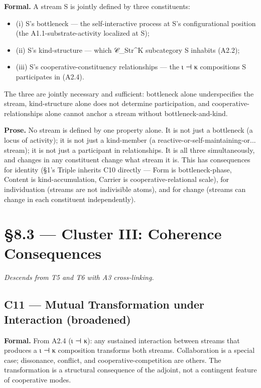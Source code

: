 \documentclass[11pt, openany]{book}
\newcommand{\sectionbreak}{\clearpage}
\begin{document}
\textbf{Formal.} A stream S is jointly defined by three constituents:

\begin{itemize}
\item (i) S's bottleneck --- the self-interactive process at S's configurational position (the A1.1-substrate-activity localized at S);
\item (ii) S's kind-structure --- which 𝒞\_\allowbreak{}Str\textasciicircum{}K subcategory S inhabits (A2.2);
\item (iii) S's cooperative-constituency relationships --- the ι ⊣ κ compositions S participates in (A2.4).
\end{itemize}

The three are jointly necessary and sufficient: bottleneck alone underspecifies the stream, kind-structure alone does not determine participation, and cooperative-relationships alone cannot anchor a stream without bottleneck-and-kind.

\textbf{Prose.} No stream is defined by one property alone. It is not just a bottleneck (a locus of activity); it is not just a kind-member (a reactive-or-self-maintaining-or... stream); it is not just a participant in relationships. It is all three simultaneously, and changes in any constituent change what stream it is. This has consequences for identity (§1's Triple inherits C10 directly --- Form is bottleneck-phase, Content is kind-accumulation, Carrier is cooperative-relational scale), for individuation (streams are not indivisible atoms), and for change (streams can change in each constituent independently).

\sectionbreak

\section{§8.3 --- Cluster III: Coherence Consequences}

\textit{Descends from T5 and T6 with A3 cross-linking.}

\subsection{C11 --- Mutual Transformation under Interaction (broadened)}

\textbf{Formal.} From A2.4 (ι ⊣ κ): any sustained interaction between streams that produces a ι ⊣ κ composition transforms both streams. Collaboration is a special case; dissonance, conflict, and cooperative-competition are others. The transformation is a structural consequence of the adjoint, not a contingent feature of cooperative modes.
\end{document}
